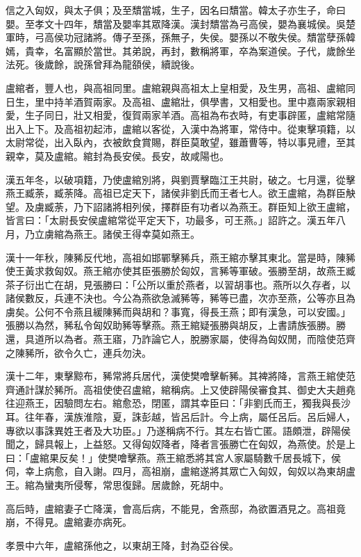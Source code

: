 \begin{pinyinscope}
信之入匈奴，與太子俱；及至穨當城，生子，因名曰穨當。韓太子亦生子，命曰嬰。至孝文十四年，穨當及嬰率其眾降漢。漢封穨當為弓高侯，嬰為襄城侯。吳楚軍時，弓高侯功冠諸將。傳子至孫，孫無子，失侯。嬰孫以不敬失侯。穨當孽孫韓嫣，貴幸，名富顯於當世。其弟說，再封，數稱將軍，卒為案道侯。子代，歲餘坐法死。後歲餘，說孫曾拜為龍頟侯，續說後。

盧綰者，豐人也，與高祖同里。盧綰親與高祖太上皇相愛，及生男，高祖、盧綰同日生，里中持羊酒賀兩家。及高祖、盧綰壯，俱學書，又相愛也。里中嘉兩家親相愛，生子同日，壯又相愛，復賀兩家羊酒。高祖為布衣時，有吏事辟匿，盧綰常隨出入上下。及高祖初起沛，盧綰以客從，入漢中為將軍，常侍中。從東擊項籍，以太尉常從，出入臥內，衣被飲食賞賜，群臣莫敢望，雖蕭曹等，特以事見禮，至其親幸，莫及盧綰。綰封為長安侯。長安，故咸陽也。

漢五年冬，以破項籍，乃使盧綰別將，與劉賈擊臨江王共尉，破之。七月還，從擊燕王臧荼，臧荼降。高祖已定天下，諸侯非劉氏而王者七人。欲王盧綰，為群臣觖望。及虜臧荼，乃下詔諸將相列侯，擇群臣有功者以為燕王。群臣知上欲王盧綰，皆言曰：「太尉長安侯盧綰常從平定天下，功最多，可王燕。」詔許之。漢五年八月，乃立虜綰為燕王。諸侯王得幸莫如燕王。

漢十一年秋，陳豨反代地，高祖如邯鄲擊豨兵，燕王綰亦擊其東北。當是時，陳豨使王黃求救匈奴。燕王綰亦使其臣張勝於匈奴，言豨等軍破。張勝至胡，故燕王臧茶子衍出亡在胡，見張勝曰：「公所以重於燕者，以習胡事也。燕所以久存者，以諸侯數反，兵連不決也。今公為燕欲急滅豨等，豨等已盡，次亦至燕，公等亦且為虜矣。公何不令燕且緩陳豨而與胡和？事寬，得長王燕；即有漢急，可以安國。」張勝以為然，豨私令匈奴助豨等擊燕。燕王綰疑張勝與胡反，上書請族張勝。勝還，具道所以為者。燕王寤，乃詐論它人，脫勝家屬，使得為匈奴閒，而陰使范齊之陳豨所，欲令久亡，連兵勿決。

漢十二年，東擊黥布，豨常將兵居代，漢使樊噲擊斬豨。其裨將降，言燕王綰使范齊通計謀於豨所。高祖使使召盧綰，綰稱病。上又使辟陽侯審食其、御史大夫趙堯往迎燕王，因驗問左右。綰愈恐，閉匿，謂其幸臣曰：「非劉氏而王，獨我與長沙耳。往年春，漢族淮陰，夏，誅彭越，皆呂后計。今上病，屬任呂后。呂后婦人，專欲以事誅異姓王者及大功臣。」乃遂稱病不行。其左右皆亡匿。語頗泄，辟陽侯聞之，歸具報上，上益怒。又得匈奴降者，降者言張勝亡在匈奴，為燕使。於是上曰：「盧綰果反矣！」使樊噲擊燕。燕王綰悉將其宮人家屬騎數千居長城下，侯伺，幸上病愈，自入謝。四月，高祖崩，盧綰遂將其眾亡入匈奴，匈奴以為東胡盧王。綰為蠻夷所侵奪，常思復歸。居歲餘，死胡中。

高后時，盧綰妻子亡降漢，會高后病，不能見，舍燕邸，為欲置酒見之。高祖竟崩，不得見。盧綰妻亦病死。

孝景中六年，盧綰孫他之，以東胡王降，封為亞谷侯。


\end{pinyinscope}
